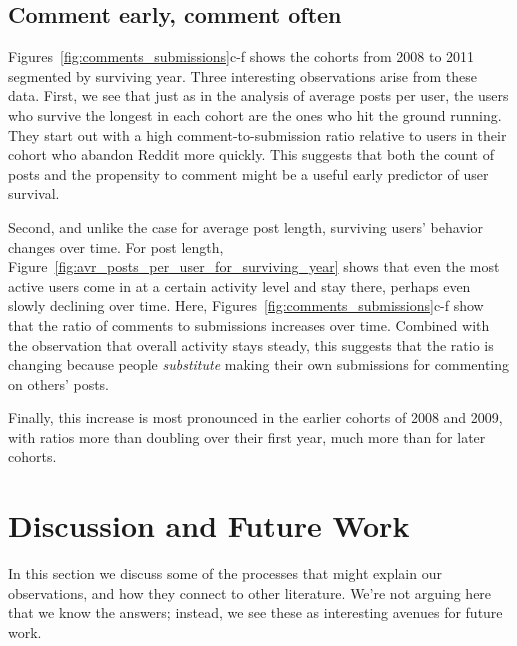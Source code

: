 \subsection{Comment early, comment often}

Figures~\ref{fig:comments_submissions}c-f shows the cohorts from 2008 to 2011 segmented by surviving year.  Three interesting observations arise from these data.  First, we see that just as in the analysis of average posts per user, the users who survive the longest in each cohort are the ones who hit the ground running.  They start out with a high comment-to-submission ratio relative to users in their cohort who abandon Reddit more quickly.  This suggests that both the count of posts and the propensity to comment might be a useful early predictor of user survival.

Second, and unlike the case for average post length, surviving users' behavior changes over time.  For post length, Figure~\ref{fig:avr_posts_per_user_for_surviving_year} shows that even the most active users come in at a certain activity level and stay there, perhaps even slowly declining over time.  Here, Figures~\ref{fig:comments_submissions}c-f show that the ratio of comments to submissions increases over time.  Combined with the observation that overall activity stays steady, this suggests that the ratio is changing because people \textit{substitute} making their own submissions for commenting on others' posts.

Finally, this increase is most pronounced in the earlier cohorts of 2008 and 2009, with ratios more than doubling over their first year, much more than for later cohorts.

\section{Discussion and Future Work}

In this section we discuss some of the processes that might explain our observations, and how they connect to other literature.  We're not arguing here that we know the answers; instead, we see these as interesting avenues for future work.


